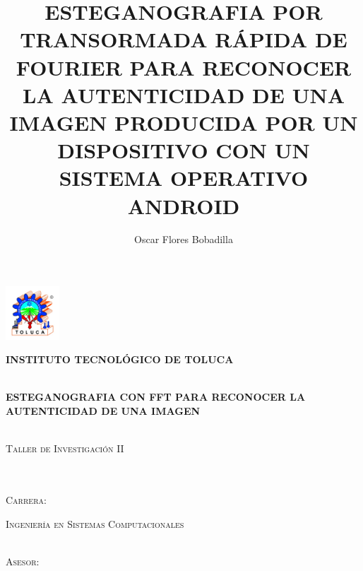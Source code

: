\documentclass[12pt]{article}
\title{
	ESTEGANOGRAFIA POR TRANSORMADA RÁPIDA DE FOURIER PARA RECONOCER LA AUTENTICIDAD DE UNA IMAGEN PRODUCIDA POR UN DISPOSITIVO CON UN SISTEMA OPERATIVO ANDROID
}
\author{Oscar Flores Bobadilla}
\begin{document}

\begin{center}
\includegraphics[width = 2cm]{itt.png}
\begin{Huge}
\textbf{\large INSTITUTO TECNOLÓGICO DE TOLUCA} \ \\ \ \\  %
\end{Huge}
\end{center}

\begin{center}
\begin{Huge}
\textbf{\large ESTEGANOGRAFIA CON FFT PARA RECONOCER LA AUTENTICIDAD DE UNA IMAGEN} \ \\ \ \\  %
\end{Huge}
\end{center}

\begin{center}
\begin{Huge}
\textsc{\Large Taller de Investigación II} \ \\ \ \\ \ \\ %
\end{Huge}
\end{center}

\begin{center}
\begin{Huge}
\textsc{\Large Carrera:}
\end{Huge}
\end{center}

\begin{center}
\begin{Huge}
\textsc{\Large Ingeniería en Sistemas Computacionales} \ \\ \ \\  %
\end{Huge}
\end{center}

\begin{center}
\begin{Huge}
\textsc{\Large Asesor:} 
\end{Huge}
\end{center}
\end{document}
